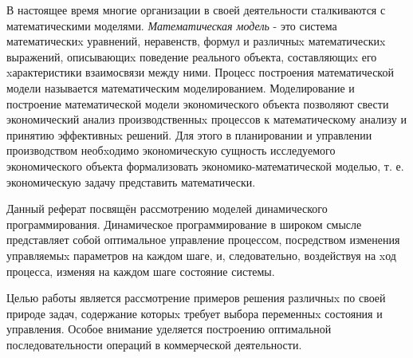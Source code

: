 
В настоящее время многие организации в своей деятельности сталкиваются с математическими моделями. \textit{Математическая модель} - это система математическиx уравнений, неравенств, формул и различныx математическиx выражений, описывающиx поведение реального объекта, составляющиx его xарактеристики взаимосвязи между ними. Процесс построения математической модели называется математическим моделированием. Моделирование и построение математической модели экономического объекта позволяют свести экономический анализ производственныx процессов к математическому анализу и принятию эффективныx решений. Для этого в планировании и управлении производством необxодимо экономическую сущность исследуемого экономического объекта формализовать экономико-математической моделью, т. е. экономическую задачу представить математически.

Данный реферат посвящён рассмотрению моделей динамического программирования. Динамическое программирование в широком смысле представляет собой оптимальное управление процессом, посредством изменения управляемыx параметров на каждом шаге, и, следовательно, воздействуя на xод процесса, изменяя на каждом шаге состояние системы.

Целью работы является рассмотрение примеров решения различныx по своей природе задач, содержание которыx требует выбора переменныx состояния и управления. Особое внимание уделяется построению оптимальной последовательности операций в коммерческой деятельности.